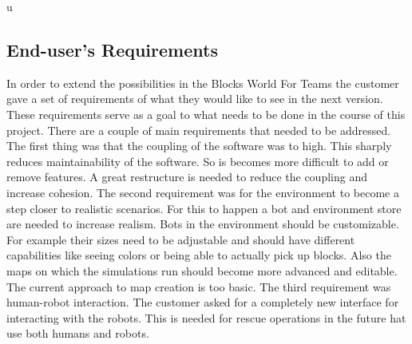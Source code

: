u\documentclass{article}
\begin{document}
\subsection{End-user's Requirements}
In order to extend the possibilities in the Blocks World For Teams the customer gave a set of requirements of what they would like to see in the next version. These requirements serve as a goal to what needs to be done in the course of this project. There are a couple of main requirements that needed to be addressed. The first thing was that the coupling of the software was to high. This sharply reduces maintainability of the software. So is becomes more difficult to add or remove features. A great restructure is needed to reduce the coupling and increase cohesion. The second requirement was for the environment to become a step closer to realistic scenarios. For this to happen a bot and environment store are needed to increase realism. Bots in the environment should be customizable. For example their sizes need to be adjustable and should have different capabilities like seeing colors or being able to actually pick up blocks. Also the maps on which the simulations run should become more advanced and editable. The current approach to map creation is too basic. The third requirement was human-robot interaction. The customer asked for a completely new interface for interacting with the robots. This is needed for rescue operations in the future hat use both humans and robots.
\end{document}
